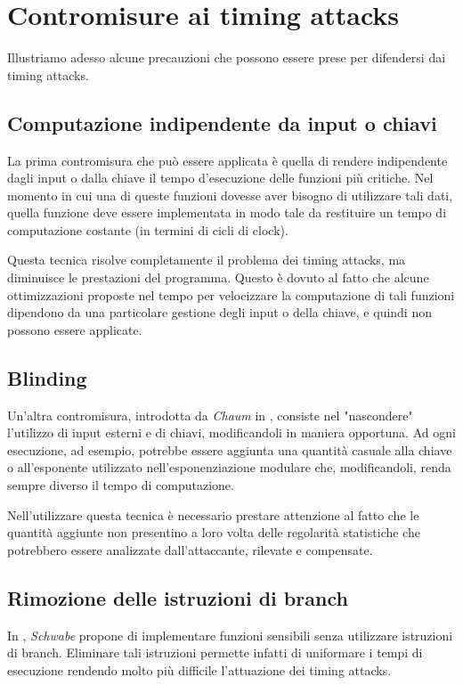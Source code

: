 	\section{Contromisure ai timing attacks}
	Illustriamo adesso alcune precauzioni che possono essere prese per difendersi dai timing attacks.
	
	\subsection*{Computazione indipendente da input o chiavi}
		La prima contromisura che può essere applicata è quella di rendere indipendente dagli input o dalla chiave il tempo d'esecuzione delle funzioni più critiche. Nel momento in cui una di queste funzioni dovesse aver bisogno di utilizzare tali dati, quella funzione deve essere implementata in modo tale da restituire un tempo di computazione costante (in termini di cicli di clock).
		
		Questa tecnica risolve completamente il problema dei timing attacks, ma diminuisce le prestazioni del programma. Questo è dovuto al fatto che alcune ottimizzazioni proposte nel tempo per velocizzare la computazione di tali funzioni dipendono da una particolare gestione degli input o della chiave, e quindi non possono essere applicate.
		
	\subsection*{Blinding}
		Un'altra contromisura, introdotta da \emph{Chaum} in \cite{chaum1983blind}, consiste nel "nascondere" l'utilizzo di input esterni e di chiavi, modificandoli in maniera opportuna. Ad ogni esecuzione, ad esempio, potrebbe essere aggiunta una quantità casuale alla chiave o all'esponente utilizzato nell'esponenziazione modulare che, modificandoli, renda sempre diverso il tempo di computazione.
		
		Nell'utilizzare questa tecnica è necessario prestare attenzione al fatto che le quantità aggiunte non presentino a loro volta delle regolarità statistiche che potrebbero essere analizzate dall'attaccante, rilevate e compensate.
		
	\subsection*{Rimozione delle istruzioni di branch}
		In \cite{schwabe2016counter}, \emph{Schwabe} propone di implementare funzioni sensibili senza utilizzare istruzioni di branch. Eliminare tali istruzioni permette infatti di uniformare i tempi di esecuzione rendendo molto più difficile l'attuazione dei timing attacks.
		
